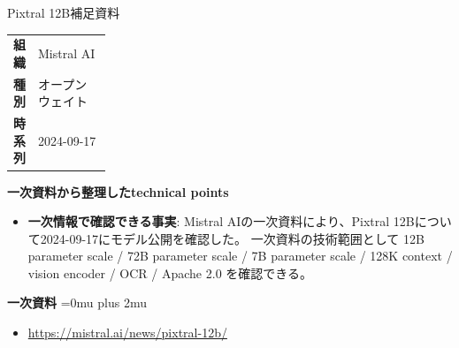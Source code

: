 \begin{technicalnote}{Pixtral 12B}{補足資料}
\begingroup
\begin{tabularx}{\linewidth}{@{}>{\bfseries}p{0.22\linewidth}X@{}}
組織 & Mistral AI \\
種別 & オープンウェイト \\
時系列 & 2024-09-17 \\
\end{tabularx}
\smallskip
{\bfseries 一次資料から整理したtechnical points}
\begin{itemize}[leftmargin=1.5em,itemsep=0.35em]
\item \textbf{一次情報で確認できる事実}: Mistral AIの一次資料により、Pixtral 12Bについて2024-09-17にモデル公開を確認した。 一次資料の技術範囲として 12B parameter scale / 72B parameter scale / 7B parameter scale / 128K context / vision encoder / OCR / Apache 2.0 を確認できる。
\end{itemize}
\begin{minipage}{\linewidth}
\begin{samepage}
{\bfseries 一次資料}
\begingroup\sloppy
\Urlmuskip=0mu plus 2mu\relax
\begin{itemize}[leftmargin=1.5em,itemsep=0.25em]
\item {\scriptsize\url{https://mistral.ai/news/pixtral-12b/}}
\end{itemize}
\endgroup
\end{samepage}
\end{minipage}
\endgroup
\end{technicalnote}
\medskip

